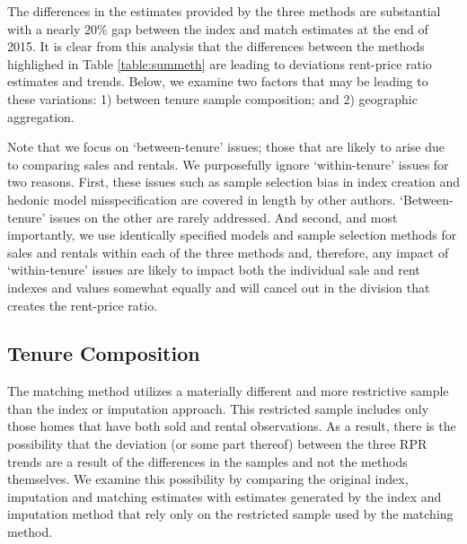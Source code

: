 \documentclass{article}\usepackage[]{graphicx}\usepackage[]{color}
\begin{document}
The differences in the estimates provided by the three methods are substantial with a nearly 20\% gap between the index and match estimates at the end of 2015. It is clear from this analysis that the differences between the methods highlighed in Table \ref{table:summeth} are leading to deviations rent-price ratio estimates and trends. Below, we examine two factors that may be leading to these variations: 1) between tenure sample composition; and 2) geographic aggregation.\par

Note that we focus on `between-tenure' issues; those that are likely to arise due to comparing sales and rentals. We purposefully ignore `within-tenure' issues for two reasons.  First, these issues such as sample selection bias in index creation \citep*{case1991choosing, haurin1991house, wallace1997construction, nagaraja2014repeat} and hedonic model misspecification \citep*{Meese1991, McMillen2003, McMillen2006} are covered in length by other authors. `Between-tenure' issues on the other are rarely addressed. And second, and most importantly, we use identically specified models and sample selection methods for sales and rentals within each of the three methods and, therefore, any impact of `within-tenure' issues are likely to impact both the individual sale and rent indexes and values somewhat equally and will cancel out in the division that creates the rent-price ratio.\par

\subsection*{Tenure Composition}

The matching method utilizes a materially different and more restrictive sample than the index or imputation approach.  This restricted sample includes only those homes that have both sold and rental observations. As a result, there is the possibility that the deviation (or some part thereof) between the three RPR trends are a result of the differences in the samples and not the methods themselves. We examine this possibility by comparing the original index, imputation and matching estimates with estimates generated by the index and imputation method that rely only on the restricted sample used by the matching method.\par
\end{document}
